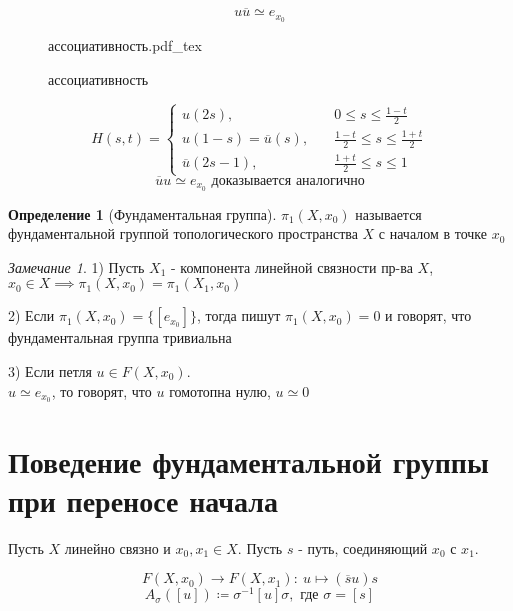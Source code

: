 \documentclass[a4paper]{article}
\newcommand{\incfig}[1]{%
\def\svgwidth{\columnwidth}
{#1.pdf_tex}
}
\theoremstyle{definition}
\newtheorem*{definition}{Определение}
\theoremstyle{remark}
\newtheorem*{remark}{Замечание}
\begin{document}
\[
    u \overline{u} \simeq e_{x_0}
\]
\begin{figure}[ht]
    \centering
    \incfig{ассоциативность}
    \caption{ассоциативность}
    \label{fig:ассоциативность}
\end{figure}

\[
    H(s,t) = 
    \begin{cases}
        u(2s), &\quad 0 \leq s \leq \frac{1-t}{2}\\
        u(1-s) = \overline{u}(s), &\quad \frac{1-t}{2} \leq s \leq \frac{1+t}{2} \\
        \overline{u}(2s-1), &\quad \frac{1+t}{2} \leq s \leq 1
    \end{cases}
\]
\[
    \overline{u} u \simeq e_{x_0} \text{ доказывается аналогично}
\]

\begin{tcolorbox}[title=Фундаментальная группа]
    \begin{definition}[Фундаментальная группа]
        $ \pi_1(X, x_0) $ называется фундаментальной группой топологического
        пространства $ X $ с началом в точке $ x_0 $ 
    \end{definition}
\end{tcolorbox}

\begin{tcolorbox}
\begin{remark}
    1) Пусть $ X_1 $ - компонента линейной связности пр-ва $ X $, $ x_0 \in X \implies
    \pi_1(X, x_0) = \pi_1(X_1, x_0)$ 

    2) Если $ \pi_1(X, x_0) = \{ [e_{x_0}] \} $, тогда пишут $ \pi_1(X, x_0) = 0 $ 
    и говорят, что фундаментальная группа тривиальна

    3) Если петля $ u \in F(X, x_0) $.\\
    $ u \simeq e_{x_0} $, то говорят, что $ u $ гомотопна нулю, $ u \simeq 0 $ 
\end{remark}
\end{tcolorbox} 

\section*{\centering Поведение фундаментальной группы при переносе начала}
Пусть $ X $ линейно связно и $ x_0, x_1 \in X $. Пусть $ s $ - путь, соединяющий
$ x_0 $ с $ x_1 $. 

\[
    F(X, x_0) \to F(X, x_1): \ u \mapsto (\overline{s} u)s
\]
\[
    A_{\sigma}([u]) \coloneqq \sigma^{-1} [u] \sigma, \text{ где } \sigma = [s]
\]
\end{document}
